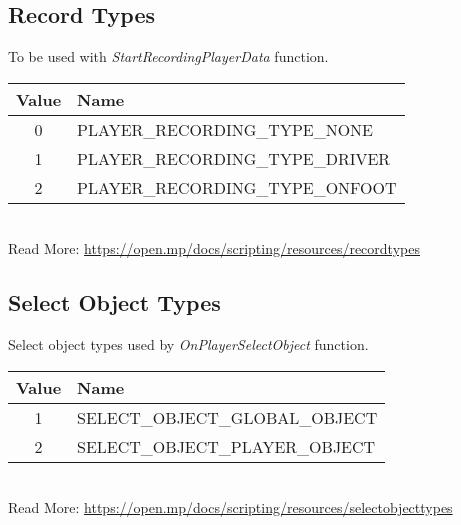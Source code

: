 \documentclass{article}
\begin{document}
\subsection{Record Types}
To be used with \textit{StartRecordingPlayerData} function.
\bigskip
\\\begin{tabular}{ |c|l| }
\hline
Value & Name \\
\hline
0 & PLAYER\_RECORDING\_TYPE\_NONE \\
1 & PLAYER\_RECORDING\_TYPE\_DRIVER \\
2 & PLAYER\_RECORDING\_TYPE\_ONFOOT \\
\hline
\end{tabular}
\bigskip
\\Read More: \url{https://open.mp/docs/scripting/resources/recordtypes}


\subsection{Select Object Types}
Select object types used by \textit{OnPlayerSelectObject} function.
\bigskip
\\\begin{tabular}{ |c|l| }
\hline
Value & Name \\
\hline
1 & SELECT\_OBJECT\_GLOBAL\_OBJECT \\
2 & SELECT\_OBJECT\_PLAYER\_OBJECT \\
\hline
\end{tabular}
\bigskip
\\Read More: \url{https://open.mp/docs/scripting/resources/selectobjecttypes}
\end{document}
